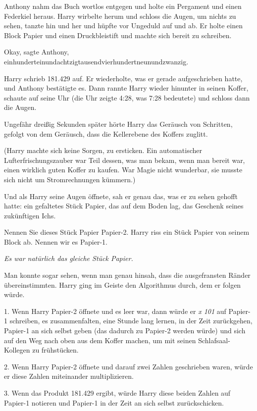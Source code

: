 Anthony nahm das Buch wortlos entgegen und holte ein Pergament und einen
Federkiel heraus. Harry wirbelte herum und schloss die Augen, um nichts zu
sehen, tanzte hin und her und hüpfte vor Ungeduld auf und ab. Er holte einen
Block Papier und einen Druckbleistift und machte sich bereit zu schreiben.

\glqq Okay\grqq{}, sagte Anthony, \glqq
einhunderteinundachtzigtausendvierhundertneunundzwanzig.\grqq{}

Harry schrieb 181.429 auf. Er wiederholte, was er gerade aufgeschrieben hatte,
und Anthony bestätigte es. Dann rannte Harry wieder hinunter in seinen Koffer,
schaute auf seine Uhr (die Uhr zeigte 4:28, was 7:28 bedeutete) und schloss dann
die Augen.

Ungefähr dreißig Sekunden später hörte Harry das Geräusch von Schritten, gefolgt
von dem Geräusch, dass die Kellerebene des Koffers zuglitt.

(Harry machte sich keine Sorgen, zu ersticken. Ein automatischer
Lufterfrischungszauber war Teil dessen, was man bekam, wenn man bereit war,
einen wirklich guten Koffer zu kaufen. War Magie nicht wunderbar, sie musste
sich nicht um Stromrechnungen kümmern.)

Und als Harry seine Augen öffnete, sah er genau das, was er zu sehen gehofft
hatte: ein gefaltetes Stück Papier, das auf dem Boden lag, das Geschenk seines
zukünftigen Ichs.

Nennen Sie dieses Stück Papier \glqq Papier-2\grqq{}. Harry riss ein Stück
Papier von seinem Block ab. Nennen wir es \glqq Papier-1\grqq{}.

\emph{Es war natürlich das gleiche Stück Papier.}

Man konnte sogar sehen, wenn man genau hinsah, dass die ausgefransten Ränder
übereinstimmten. Harry ging im Geiste den Algorithmus durch, dem er folgen
würde.

1. Wenn Harry Papier-2 öffnete und es leer war, dann würde er \emph{ x
101\grqq{} } auf Papier-1 schreiben, es zusammenfalten, eine Stunde lang lernen,
in der Zeit zurückgehen, Papier-1 an sich selbst geben (das dadurch zu Papier-2
werden würde) und sich auf den Weg nach oben aus dem Koffer machen, um mit
seinen Schlafsaal-Kollegen zu frühstücken.

2. Wenn Harry Papier-2 öffnete und darauf zwei Zahlen geschrieben waren, würde
er diese Zahlen miteinander multiplizieren.

3. Wenn das Produkt 181.429 ergibt, würde Harry diese beiden Zahlen auf Papier-1
notieren und Papier-1 in der Zeit an sich selbst zurückschicken.

